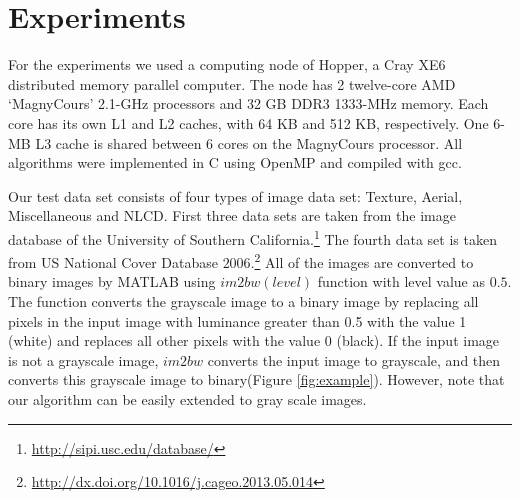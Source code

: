 \vspace{\sectionSpace}
\section{Experiments}
\label{sec:experiments}
For the experiments we used a computing node of Hopper, a Cray XE6 distributed memory parallel computer. 
The node has 2 twelve-core AMD ‘MagnyCours’ 2.1-GHz processors and 32 GB DDR3 1333-MHz memory. 
Each core has its own L1 and L2 caches, with 64 KB and 512 KB, respectively. 
One 6-MB L3 cache is shared between 6 cores on the MagnyCours processor. 
All algorithms were implemented in C using OpenMP and compiled with gcc.

Our test data set consists of four types of image data set: Texture, Aerial,
Miscellaneous and NLCD. First three data sets are taken from the image database of the University of 
Southern
California.\footnote{\url{http://sipi.usc.edu/database/}} 
The fourth data set is taken from US National Cover Database
$2006$.\footnote{\url{http://dx.doi.org/10.1016/j.cageo.2013.05.014}} All of the
images are converted to binary images by MATLAB using $im2bw(level)$ function with level value as $0.5$. The function 
converts the grayscale image to a binary image by replacing all pixels in the input image with luminance greater than 
0.5 with the value 1 (white) and replaces all other pixels with the value 0 (black). If the input image is not a grayscale image, 
$im2bw$ converts the input image to grayscale, and then converts this grayscale image to binary(Figure \ref{fig:example}). However, note that our
algorithm can be easily extended to gray scale images.






